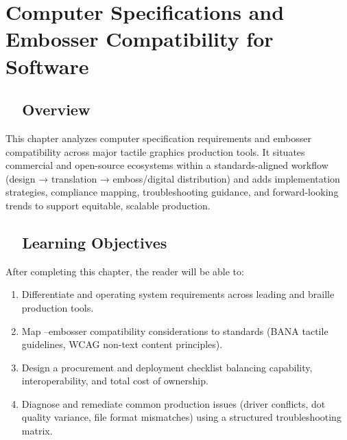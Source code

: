 \chapter{Computer Specifications and Embosser Compatibility for  Software}\label{ch14:tactile-graphics-specs}
\raggedright
\section{~~Overview}\label{ch14:sec:overview}
This chapter analyzes computer specification requirements and embosser compatibility across major tactile graphics production tools. It situates commercial and open-source ecosystems within a standards-aligned workflow (design → translation → emboss/digital distribution) and adds implementation strategies, compliance mapping, troubleshooting guidance, and forward-looking trends to support equitable, scalable production.

\section{~~Learning Objectives}\label{ch14:sec:learning-objectives}
After completing this chapter, the reader will be able to:
\begin{enumerate}
	\item Differentiate  and operating system requirements across leading  and braille production tools.
	\item Map –embosser compatibility considerations to standards (BANA tactile guidelines, WCAG non-text content principles).
	\item Design a procurement and deployment checklist balancing capability, interoperability, and total cost of ownership.
	\item Diagnose and remediate common production issues (driver conflicts, dot quality variance, file format mismatches) using a structured troubleshooting matrix.
\end{enumerate}

